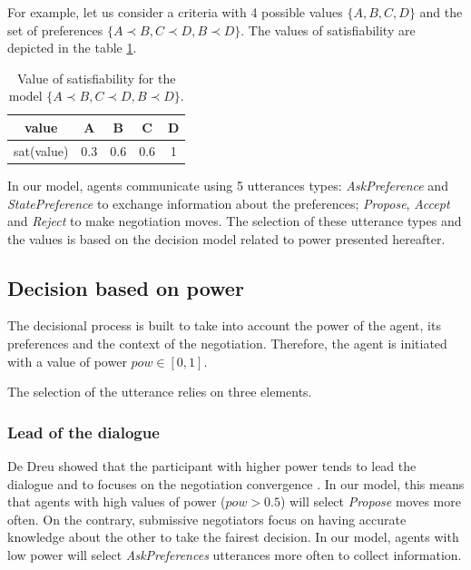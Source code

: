 \documentclass[conference, letterpaper]{IEEEtran}
\begin{document}
	\par For example, let us consider a criteria with 4 possible values $\{A, B, C, D\}$ and the set of preferences $\{A \prec B, C \prec D , B \prec D \}$. The values of satisfiability are depicted in the table \ref{tab:sat}.
	\begin{table}
		\centering
		\begin{tabular}{ |c|c|c|c|c| }
			\hline				
			value & A & B & C & D \\
			\hline
			
			\hline
			sat(value) & 0.3 & 0.6 & 0.6 & 1 \\
			\hline
			
		\end{tabular}
		\caption{Value of satisfiability for the model $\{A \prec B, C \prec D , B \prec D \}$.}
		\label{tab:sat}
	\end{table}
	
	\par
	In our model, agents communicate using 5 utterances types: \emph{AskPreference} and \emph{StatePreference} to exchange information about the preferences; \emph{Propose}, \emph{Accept} and \emph{Reject} to make negotiation moves. The selection of these utterance types and the values is based on the decision model related to power presented hereafter.
	
	\subsection{Decision based on power}
	
	The decisional process is built to take into account the power of the agent, its preferences and the context of the negotiation. Therefore, the agent is initiated with a value of power $pow \in [0,1]$. 
	
	The selection of the utterance relies on three elements.
	
	\subsubsection{Lead of the dialogue}
	De Dreu showed that the participant with higher power tends to lead the dialogue and to focuses on the negotiation convergence \cite{magee2007power,de2004influence}. In our model, this means that agents with high values of power ($pow>0.5$) will select \emph{Propose} moves more often. On the contrary, submissive negotiators focus on having accurate knowledge about the other to take the fairest decision. In our model, agents with low power will select \emph{AskPreferences} utterances more often to collect information.
	
\end{document}
